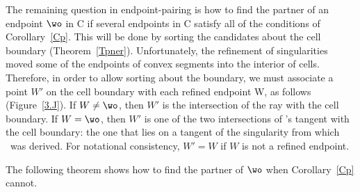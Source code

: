 The remaining question in endpoint-pairing is how to find the partner 
of an endpoint $\wo$ in C if several endpoints in C satisfy all of the 
conditions of Corollary~\ref{Cp}.  
This will be done by sorting the candidates about the cell boundary
(Theorem~\ref{Tpner}).
Unfortunately, the refinement of singularities moved some of the endpoints 
of convex segments into the interior of cells.  
Therefore, in order to allow sorting about the boundary, we must associate 
a point $W'$ on the cell boundary with each refined endpoint W, as follows
(Figure~\ref{3.J}).
If $W \neq \wo$,  then $W'$ is the intersection of the ray  
with the cell boundary.
%
%
If $W = \wo$, then $W'$ is one of the two intersections of \wo's tangent with
the cell boundary: the one that lies on a tangent of the singularity
from which \wo\ was derived.
For notational consistency, $W' = W$ if $W$ is not a refined endpoint.

The following theorem shows how to find the partner of $\wo$ when Corollary~\ref{Cp} cannot.

